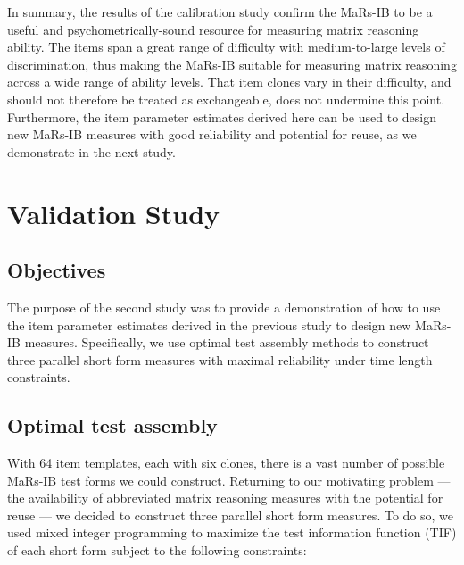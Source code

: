 \documentclass[a4paper,man,natbib]{apa6}
\begin{document}
In summary, the results of the calibration study confirm the MaRs-IB to be a useful and psychometrically-sound resource for measuring matrix reasoning ability. The items span a great range of difficulty with medium-to-large levels of discrimination, thus making the MaRs-IB suitable for measuring matrix reasoning across a wide range of ability levels. That item clones vary in their difficulty, and should not therefore be treated as exchangeable, does not undermine this point. Furthermore, the item parameter estimates derived here can be used to design new MaRs-IB measures with good reliability and potential for reuse, as we demonstrate in the next study. 

\section{Validation Study}

\subsection{Objectives}

The purpose of the second study was to provide a demonstration of how to use the item parameter estimates derived in the previous study to design new MaRs-IB measures. Specifically, we use optimal test assembly methods to construct three parallel short form measures with maximal reliability under time length constraints. 

\subsection{Optimal test assembly}

With 64 item templates, each with six clones, there is a vast number of possible MaRs-IB test forms we could construct. Returning to our motivating problem --- the availability of abbreviated matrix reasoning measures with the potential for reuse --- we decided to construct three parallel short form measures. To do so, we used mixed integer programming \citep{der2005wj} to maximize the test information function (TIF) of each short form subject to the following constraints:
\end{document}
